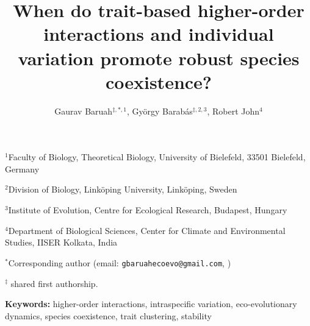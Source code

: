 \documentclass[11pt]{article}
\begin{document}
\title{When do trait-based higher-order interactions and individual variation promote robust species coexistence?}
\author{Gaurav Baruah$^{ \ddag, \ast,1}$, Gy\"orgy Barab\'as$^{\ddag, 2,3}$, Robert John$^4$}
\date{}

\maketitle

\doublespacing

\noindent $^1$Faculty of Biology, Theoretical Biology, University of Bielefeld, 33501 Bielefeld, Germany

\noindent $^2$Division of Biology, Link\"oping University, Link\"oping, Sweden

\noindent $^3$Institute of Evolution, Centre for Ecological Research, Budapest, Hungary

\noindent $^4$Department of Biological Sciences, Center for Climate and Environmental Studies, IISER Kolkata, India

\noindent $^\ast$Corresponding author (email: \texttt{gbaruahecoevo@gmail.com}, )

\noindent $^{\ddag}$ shared first authorship.

\bigskip



\bigskip


\noindent \textbf{Keywords:} higher-order interactions, intraspecific variation, eco-evolutionary dynamics, species coexistence, trait clustering, stability

\newpage{}
\linenumbers
\end{document}
